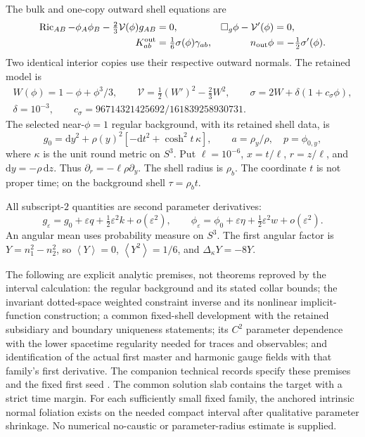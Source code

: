 \documentclass[11pt]{article}
\newcommand{\eps}{\varepsilon}
\newcommand{\dd}{\mathrm d}
\newcommand{\av}[1]{\left\langle #1\right\rangle}
\begin{document}
The bulk and one-copy outward shell equations are
\begin{align}
 \operatorname{Ric}_{AB}-\phi_A\phi_B-\tfrac23\mathcal V(\phi)g_{AB}&=0,
 &\Box_g\phi-\mathcal V'(\phi)&=0, \label{eq:model}\\
 K^{\rm out}_{ab}&=\tfrac16\sigma(\phi)\gamma_{ab},
 &n_{\rm out}\phi&=-\tfrac12\sigma'(\phi). \label{eq:shell}
\end{align}
Two identical interior copies use their respective outward normals. The
retained model is
\begin{gather}
 W(\phi)=1-\phi+\phi^3/3,\qquad
 \mathcal V=\tfrac12(W')^2-\tfrac23W^2,\qquad
 \sigma=2W+\delta(1+c_\sigma\phi), \nonumber\\
 \delta=10^{-3},\qquad c_\sigma=96714321425692/161839258930731.
 \label{eq:potential}
\end{gather}
The selected near-$\phi=1$ regular background, with its retained shell
data, is
\begin{equation}
 g_0=\dd y^2+\rho(y)^2[-\dd t^2+\cosh^2t\,\kappa],\qquad
 a=\rho_y/\rho,\quad p=\phi_{0,y}, \label{eq:background}
\end{equation}
where $\kappa$ is the unit round metric on $S^3$. Put
$\ell=10^{-6}$, $x=t/\ell$, $r=z/\ell$, and $\dd y=-\rho\,\dd z$.
Thus $\partial_r=-\ell\rho\partial_y$. The shell radius is $\rho_b$.
The coordinate $t$ is not proper time; on the background shell
$\tau=\rho_b t$.

All subscript-$2$ quantities are second parameter derivatives:
\begin{equation}
 g_\eps=g_0+\eps q+\tfrac12\eps^2 k+o(\eps^2),\qquad
 \phi_\eps=\phi_0+\eps\eta+\tfrac12\eps^2w+o(\eps^2).
 \label{eq:factorial}
\end{equation}
An angular mean uses probability measure on $S^3$. The first angular
factor is $Y=n_1^2-n_2^2$, so
$\av{Y}=0$, $\av{Y^2}=1/6$, and $\Delta_\kappa Y=-8Y$.

The following are explicit analytic premises, not theorems reproved by
the interval calculation: the regular background and its stated collar
bounds; the invariant dotted-space weighted constraint inverse and its
nonlinear implicit-function construction; a common fixed-shell development
with the retained subsidiary and boundary uniqueness statements; its $C^2$
parameter dependence with the lower spacetime regularity needed for traces
and observables; and identification of the actual first master and harmonic
gauge fields with that family's first derivative. The companion technical
records specify these premises and the fixed first seed \cite{companion}.
The common solution slab contains the target with a strict time margin.
For each sufficiently small fixed family, the anchored intrinsic normal
foliation exists on the needed compact interval after qualitative parameter
shrinkage. No numerical no-caustic or parameter-radius estimate is supplied.
\end{document}
